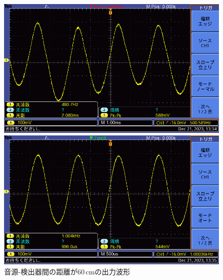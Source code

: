 \documentclass{ltjsarticle}
\begin{document}
\begin{figure}[H]
\begin{minipage}{0.4\columnwidth}
			\end{minipage}
			\hspace{0.04\columnwidth}
			\begin{minipage}{0.4\columnwidth}
			\centering
			\includegraphics[width = \columnwidth]{figs/F0039TEK.PNG}
			\end{minipage}
			\hspace{0.04\columnwidth}
			\begin{minipage}{0.4\columnwidth}
			\centering
			\includegraphics[width = \columnwidth]{figs/F0040TEK.PNG}
			\end{minipage}
			\caption{音源-検出器間の距離が60\,cmの出力波形}
			\label{fig:week5-3-60}
			\end{figure}
\end{document}
